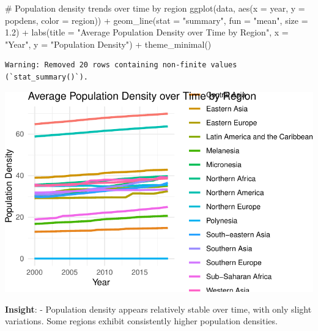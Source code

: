 \documentclass[
  letterpaper,
  DIV=11,
  numbers=noendperiod]{scrartcl}
\newenvironment{Shaded}{\begin{snugshade}}{\end{snugshade}}
\newcommand{\AttributeTok}[1]{\textcolor[rgb]{0.40,0.45,0.13}{#1}}
\newcommand{\CommentTok}[1]{\textcolor[rgb]{0.37,0.37,0.37}{#1}}
\newcommand{\FloatTok}[1]{\textcolor[rgb]{0.68,0.00,0.00}{#1}}
\newcommand{\FunctionTok}[1]{\textcolor[rgb]{0.28,0.35,0.67}{#1}}
\newcommand{\NormalTok}[1]{\textcolor[rgb]{0.00,0.23,0.31}{#1}}
\newcommand{\SpecialCharTok}[1]{\textcolor[rgb]{0.37,0.37,0.37}{#1}}
\newcommand{\StringTok}[1]{\textcolor[rgb]{0.13,0.47,0.30}{#1}}
\begin{document}
\begin{Shaded}
\begin{Highlighting}[]
\CommentTok{\# Population density trends over time by region}
\FunctionTok{ggplot}\NormalTok{(data, }\FunctionTok{aes}\NormalTok{(}\AttributeTok{x =}\NormalTok{ year, }\AttributeTok{y =}\NormalTok{ popdens, }\AttributeTok{color =}\NormalTok{ region)) }\SpecialCharTok{+}
  \FunctionTok{geom\_line}\NormalTok{(}\AttributeTok{stat =} \StringTok{"summary"}\NormalTok{, }\AttributeTok{fun =} \StringTok{"mean"}\NormalTok{, }\AttributeTok{size =} \FloatTok{1.2}\NormalTok{) }\SpecialCharTok{+}
  \FunctionTok{labs}\NormalTok{(}\AttributeTok{title =} \StringTok{"Average Population Density over Time by Region"}\NormalTok{, }\AttributeTok{x =} \StringTok{"Year"}\NormalTok{, }\AttributeTok{y =} \StringTok{"Population Density"}\NormalTok{) }\SpecialCharTok{+}
  \FunctionTok{theme\_minimal}\NormalTok{()}
\end{Highlighting}
\end{Shaded}

\begin{verbatim}
Warning: Removed 20 rows containing non-finite values (`stat_summary()`).
\end{verbatim}

\includegraphics{EDA_files/figure-pdf/unnamed-chunk-9-1.pdf}

\textbf{Insight}: - Population density appears relatively stable over
time, with only slight variations. Some regions exhibit consistently
higher population densities.
\end{document}
